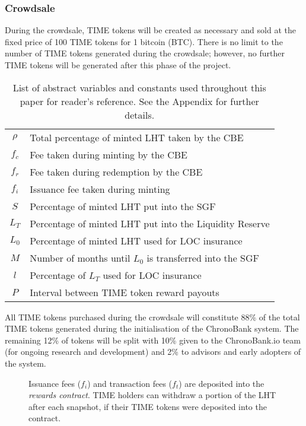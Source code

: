 \begin{multicols}{2}
\subsubsection{Crowdsale}
\label{sec:Crowdsale}
During the crowdsale, TIME tokens will be created as necessary and sold at the fixed price of \num{100} TIME tokens for 1 bitcoin (BTC). There is no limit to the number of TIME tokens generated during the crowdsale; however, no further TIME tokens will be generated after this phase of the project.

\begin{table}[H]
  \setlength{\tabcolsep}{8pt}
  \begin{tabular}{c | l}
  $\rho$ & Total percentage of minted LHT taken by the CBE \\
  $f_c$ & Fee taken during minting by the CBE \\
  $f_r$ & Fee taken during redemption by the CBE \\
  $f_i$ & Issuance fee taken during minting \\
  $S$ & Percentage of minted LHT put into the SGF\\
  $L_T$ & Percentage of minted LHT put into the Liquidity Reserve\\
  $L_0$ & Percentage of minted LHT used for LOC insurance\\
  $M$ & Number of months until $L_0$ is transferred into the SGF\\
  $l$ & Percentage of $L_T$ used for LOC insurance\\
  $P$ & Interval between TIME token reward payouts\\
  \end{tabular}
  \caption{List of abstract variables and constants used throughout this paper for reader's reference. See the Appendix for further details. }
  \label{tab:variables}
\end{table}

All TIME tokens purchased during the crowdsale will constitute \num{88}\% of the total TIME tokens generated during the initialisation of the ChronoBank system. The remaining \num{12}\% of tokens will be split with 10\% given to the ChronoBank.io team (for ongoing research and development) and 2\% to advisors and early adopters of the system.

\begin{figure}[H]
	\centering
	\def\svgwidth{\columnwidth}
	
	\caption{Issuance fees ($f_i$) and transaction fees ($f_t$) are deposited into the \textit{rewards contract}. TIME holders can withdraw a portion of the LHT after each snapshot, if their TIME tokens were deposited into the contract.}
	\label{fig:time-payout}
\end{figure}



\end{multicols}
